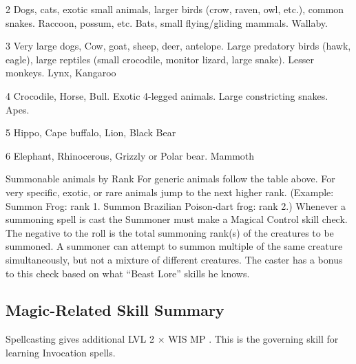 \documentclass[twoside]{book}
\begin{document}
                  
                   2   
                     Dogs, cats, exotic small animals, larger birds
                     (crow, raven, owl, etc.), common snakes. Raccoon,
                     possum, etc. Bats, small flying/gliding mammals.
                     Wallaby. 
                  
                  
                   3   
                     Very large dogs, Cow, goat, sheep, deer,
                     antelope. Large predatory birds (hawk, eagle), large
                     reptiles (small crocodile, monitor lizard, large
                     snake). Lesser monkeys. Lynx, Kangaroo 
                  
                  
                   4   
                     Crocodile, Horse, Bull. Exotic 4-legged
                     animals. Large constricting snakes. Apes. 
                  
                  
                   5   
                   Hippo, Cape buffalo, Lion, Black Bear   
                  
                  
                   6   
                     Elephant, Rhinocerous, Grizzly or Polar bear.
                     Mammoth 
                  
                
              Summonable animals by Rank  
              For generic animals follow the table above. For
               very specific, exotic, or rare animals jump to the next
               higher rank. (Example: Summon Frog: rank 1. Summon
               Brazilian Poison-dart frog: rank 2.)   Whenever a summoning spell is cast the Summoner
               must make a Magical Control skill check. The negative to
               the roll is the total summoning rank(s) of the creatures
               to be summoned. A summoner can attempt to summon multiple
               of the same creature simultaneously, but not a mixture of
               different creatures. The caster has a bonus to this check
               based on what “Beast Lore” skills he knows.
               
\subsection{Magic-Related Skill Summary}
      
                Spellcasting gives additional     
                       LVL  2   
                        ×  WIS  MP
                           . This is the governing skill
                      for learning Invocation spells.
                
\end{document}
